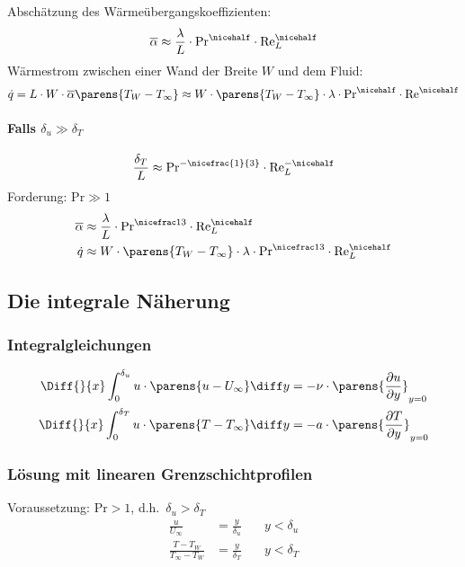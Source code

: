 				Abschätzung des Wärmeübergangskoeffizienten:
				\[
					\overline\alpha \approx \frac{\lambda}{L} \cdot \mathrm{Pr}^{\nicehalf} \cdot \mathrm{Re}_L^{\nicehalf}
				\]
				Wärmestrom zwischen einer Wand der Breite $W$ und dem Fluid:
				\[
					\dot q = L \cdot W \cdot \overline\alpha \parens{T_W - T_\infty}
					\approx W \cdot \parens{T_W - T_\infty} \cdot \lambda \cdot \mathrm{Pr}^{\nicehalf} \cdot \mathrm{Re}^{\nicehalf}
				\]

			\paragraph{Falls $\delta_u \gg \delta_T$} %
				\[
					\frac{\delta_T}{L} \approx \mathrm{Pr}^{- \nicefrac{1}{3}} \cdot \mathrm{Re}_L^{-\nicehalf}
				\]
				Forderung: $\mathrm{Pr} \gg 1$
				\begin{align*}
					\overline\alpha &\approx \frac \lambda L \cdot \mathrm{Pr}^{\nicefrac 1 3} \cdot \mathrm{Re}_L^{\nicehalf} \\
					\dot q &\approx W \cdot \parens{T_W - T_\infty} \cdot \lambda \cdot \mathrm{Pr}^{\nicefrac 1 3} \cdot \mathrm{Re}_L^{\nicehalf}
				\end{align*}

	\subsection{Die integrale Näherung} %
		\subsubsection{Integralgleichungen} %
			\begin{align*}
				\Diff{}{x} \int_0^{\delta_u} u \cdot \parens{ u - U_\infty } \diff y &= - \nu \cdot \parens{ \frac{\partial u}{\partial y} }_{y=0} \\
				\Diff{}{x} \int_0^{\delta_T} u \cdot \parens{ T - T_\infty } \diff y &= - a \cdot \parens{ \frac{\partial T}{\partial y} }_{y=0}
			\end{align*}

		\subsubsection{Lösung mit linearen Grenzschichtprofilen} %
			Voraussetzung: $\mathrm{Pr} > 1$, d.h.~$\delta_u > \delta_T$
			\begin{align*}
				\frac{u}{U_\infty} &= \frac{y}{\delta_u} \quad & y<\delta_u \\
				\frac{T-T_W}{T_\infty-T_W} &= \frac{y}{\delta_T} \quad & y<\delta_T
			\end{align*}

